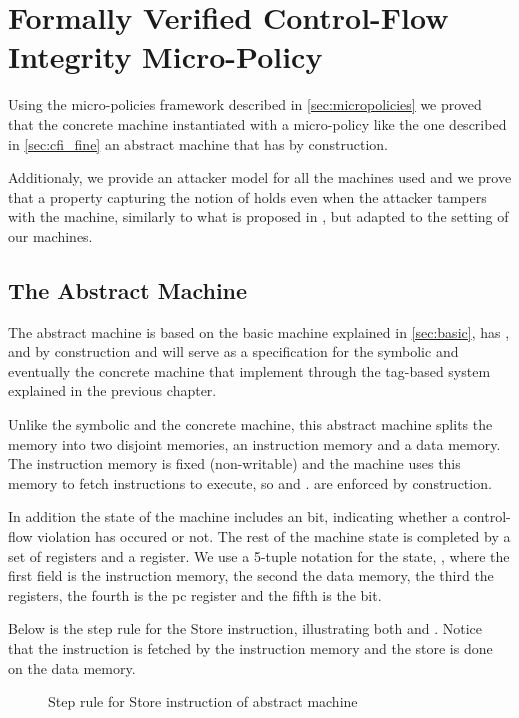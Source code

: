 \chapter{Formally Verified Control-Flow Integrity Micro-Policy}\label{ch:verified_cfi}

Using the micro-policies framework described in \ref{sec:micropolicies} we 
proved that the concrete machine instantiated with a \CFI micro-policy like the
one described in \ref{sec:cfi_fine}  an abstract machine that has
\CFI by construction.

Additionaly, we provide an attacker model for all the machines used and we prove
that a property capturing the notion of \CFI holds even when the attacker
tampers with the machine, similarly to what is proposed in \cite{abadi2005}, but
adapted to the setting of our machines.

\section{The Abstract Machine}\label{sec:abstract_cfi}

The abstract machine is based on the basic machine explained in \ref{sec:basic},
has \CFI, \NXD and \NWC by construction and will serve as a 
specification for the symbolic and eventually the concrete machine that
implement \CFI through the tag-based system explained in the previous chapter.

Unlike the symbolic and the concrete machine, this abstract machine splits the 
memory into two disjoint memories, an instruction memory and a data memory. The
instruction memory is fixed (non-writable) and the machine uses this memory to
fetch instructions to execute, so \NWC and \NXD. are enforced by construction.

In addition the state of the machine includes an \ok bit, indicating 
whether a control-flow violation has occured or not. The rest of the machine
state is completed by a set of registers and a \pc register. We use a 5-tuple
notation for the state, \acfistat{\imem,\dmem,\reg,\pc,\ok}, where the first
field is the instruction memory, the second the data memory, the third the
registers, the fourth is the pc register and the fifth is the \ok bit.

Below is the step rule for the Store instruction, illustrating both \NWC and 
\NXD. Notice that the instruction is fetched by the instruction memory and
the store is done on the data memory.

\begin{figure}[!htpb]
\caption{Step rule for Store instruction of abstract machine}
\end{figure}

